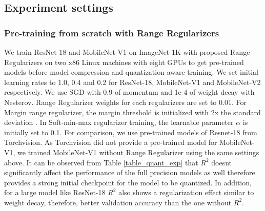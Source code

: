 \documentclass[10pt,twocolumn,letterpaper]{article}
\begin{document}
\subsection{Experiment settings}
\subsubsection{Pre-training from scratch with Range Regularizers}
We train ResNet-18\cite{he2016deep} and MobileNet-V1\cite{howard2017mobilenets} on ImageNet 1K\cite{deng2009imagenet} with proposed Range Regularizers on two x86 Linux machines with eight GPUs to get pre-trained models before model compression and quantization-aware training. We set initial learning rates to 1.0, 0.4 and 0.2 for ResNet-18, MobileNet-V1 and MobileNet-V2 respectively. We use SGD with 0.9 of momentum and 1e-4 of weight decay with Nesterov. Range Regularizer weights for each regularizers are set to 0.01. For Margin range regularizer, the margin threshold is initialized with 2x the standard deviation . In Soft-min-max regularizer training, the learnable parameter $\alpha$ is initially set to 0.1. For comparison, we use pre-trained models of Resnet-18 from Torchvision. As Torchvision did not provide a pre-trained model for MobileNet-V1, we trained MobileNet-V1 without Range Regularizer using the same settings above. It can be observed from Table \ref{table_quant_exp} that $R^2$ doesnt significantly affect the performance of the full precision models as well therefore provides a strong initial checkpoint for the model to be quantized. In addition, for a large model like ResNet-18 $R^2$ also shows a regularization effect similar to weight decay, therefore, better validation accuracy than the one without $R^2$.
\end{document}

